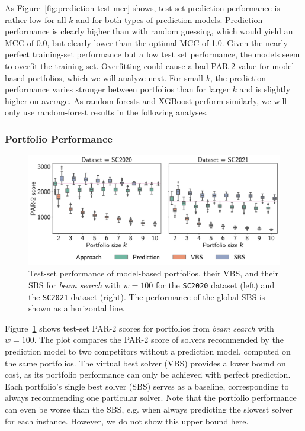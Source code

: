 \documentclass[a4paper,USenglish,pdfa]{lipics-v2021} %
\begin{document}
As Figure~\ref{fig:prediction-test-mcc} shows, test-set prediction performance is rather low for all $k$ and for both types of prediction models.
Prediction performance is clearly higher than with random guessing, which would yield an MCC of 0.0, but clearly lower than the optimal MCC of 1.0.
Given the nearly perfect training-set performance but a low test set performance, the models seem to overfit the training set.
Overfitting could cause a bad \mbox{PAR-2} value for model-based portfolios, which we will analyze next.
For small $k$, the prediction performance varies stronger between portfolios than for larger $k$ and is slightly higher on average.
As random forests and XGBoost perform similarly, we will only use random-forest results in the following analyses.

\subsubsection{Portfolio Performance}

\begin{figure}[htb]
	\centering
	\includegraphics[width=\columnwidth]{plots/prediction-test-objective-beam.pdf}
	\caption{
		Test-set performance of model-based portfolios, their VBS, and their SBS for \emph{beam search} with $w=100$ for the \texttt{SC2020} dataset (left) and the \texttt{SC2021} dataset (right).
		The performance of the global SBS is shown as a horizontal line.}
	\label{fig:prediction-test-objective-beam}
\end{figure}

Figure~\ref{fig:prediction-test-objective-beam} shows test-set PAR-2 scores for portfolios from \emph{beam search} with $w=100$.
The plot compares the PAR-2 score of solvers recommended by the prediction model to two competitors without a prediction model, computed on the same portfolios.
The virtual best solver (VBS) provides a lower bound on cost, as its portfolio performance can only be achieved with perfect prediction.
Each portfolio's single best solver (SBS) serves as a baseline, corresponding to always recommending one particular solver.
Note that the portfolio performance can even be worse than the SBS, e.g. when always predicting the slowest solver for each instance.
However, we do not show this upper bound here.
\end{document}
